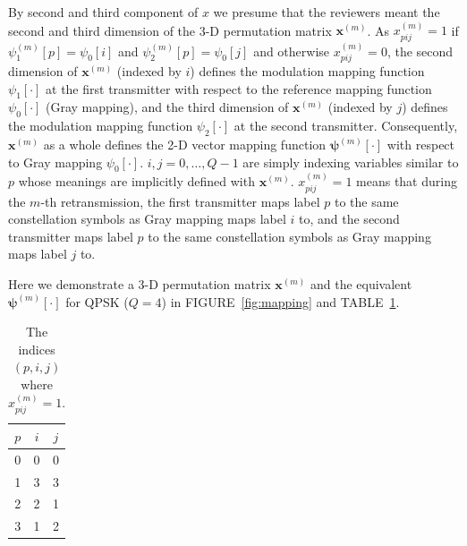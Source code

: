 \documentclass[onecolumn, 11pt, draftclsnofoot]{IEEEtran}
\begin{document}
By second and third component of $x$ we presume that the reviewers meant the
second and third dimension of the 3-D permutation matrix $\mathbf{x}^{(m)}$. As
$x_{pij}^{(m)}=1$ if $\psi_1^{(m)}[p] = \psi_0[i]$ and $\psi_2^{(m)}[p] =
\psi_0[j]$ and otherwise $x_{pij}^{(m)}=0$, the second dimension of
$\mathbf{x}^{(m)}$ (indexed by $i$) defines the modulation mapping function $\psi_1[\cdot]$ at the
first transmitter with respect to the reference mapping function
$\psi_0[\cdot]$ (Gray mapping), and the third dimension of $\mathbf{x}^{(m)}$
(indexed by $j$) defines the modulation mapping function $\psi_2[\cdot]$ at the second
transmitter. Consequently, $\mathbf{x}^{(m)}$ as a whole defines the 2-D vector
mapping function $\bm{\psi}^{(m)}[\cdot]$ with respect to Gray mapping
$\psi_0[\cdot]$. $i,j=0,\ldots,Q-1$ are simply indexing variables similar
to $p$ whose meanings are implicitly defined with $\mathbf{x}^{(m)}$.
$x_{pij}^{(m)}=1$ means that during the $m$-th retransmission, the first transmitter maps label $p$ to the same constellation
symbols as Gray mapping maps label $i$ to, and the second transmitter maps label
$p$ to the same constellation symbols as Gray mapping maps label $j$ to.

Here we demonstrate a 3-D permutation matrix $\mathbf{x}^{(m)}$ and the
equivalent $\bm{\psi}^{(m)}[\cdot]$ for QPSK ($Q=4$) in FIGURE~\ref{fig:mapping}
and TABLE~\ref{table:x}.


\begin{table}[!t]
  \renewcommand{\arraystretch}{1.3}
  \caption{The indices $(p,i,j)$ where $x_{pij}^{(m)}=1.$}
  \label{table:x}
  \centering
  \begin{tabular}{c|c|c}
    \hline
    $p$ & $i$ & $j$  \\
    \hline
    0 &  0 & 0 \\
    1 & 3 & 3 \\
    2 & 2 & 1 \\
    3 & 1 & 2 \\
    \hline
  \end{tabular}
\end{table}
\end{document}
